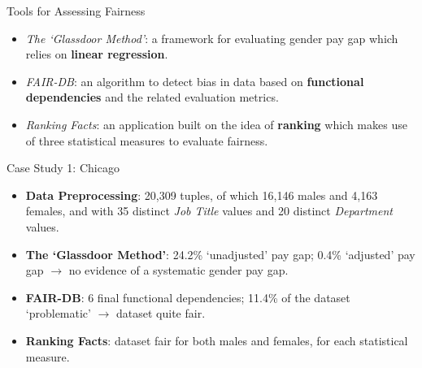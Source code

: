 \documentclass[usenames,dvipsnames]{beamer}
\begin{document}
    
    \begin{frame}{Tools for Assessing Fairness}
        \begin{itemize}
            \item \textit{The `Glassdoor Method'}: a framework for evaluating gender pay gap which relies on \textbf{linear regression}.
            \item \textit{FAIR-DB}: an algorithm to detect bias in data based on \textbf{functional dependencies} and the related evaluation metrics.
            \item \textit{Ranking Facts}: an application built on the idea of \textbf{ranking} which makes use of three statistical measures to evaluate fairness.
        \end{itemize}
    \end{frame}
    
    
    \begin{frame}{Case Study 1: Chicago}
        \begin{itemize}
            \item \textbf{Data Preprocessing}: 20,309 tuples, of which 16,146 males and 4,163 females, and with 35 distinct \textit{Job Title} values and 20 distinct \textit{Department} values.\newline
            \item \textbf{The `Glassdoor Method'}: 24.2\% `unadjusted' pay gap; 0.4\% `adjusted' pay gap $\rightarrow$ no evidence of a systematic gender pay gap.
            \item \textbf{FAIR-DB}: 6 final functional dependencies; 11.4\% of the dataset `problematic' $\rightarrow$ dataset quite fair.
            \item \textbf{Ranking Facts}: dataset fair for both males and females, for each statistical measure.
        \end{itemize}
    \end{frame}
    
\end{document}
